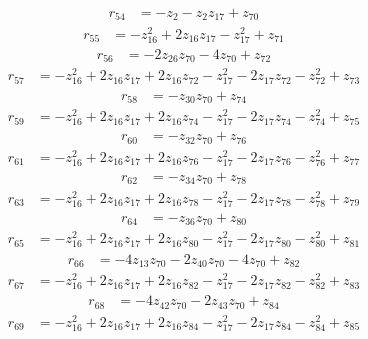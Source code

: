 \begin{align*}
r_{54} &=-z_{2}-z_{2}z_{17}+z_{70}
\end{align*}
\begin{align*}
r_{55} &=-z_{16}^{2}+2z_{16}z_{17}-z_{17}^{2}+z_{71}
\end{align*}
\begin{align*}
r_{56} &=-2z_{26}z_{70}-4z_{70}+z_{72}
\end{align*}
\begin{align*}
r_{57} &=-z_{16}^{2}+2z_{16}z_{17}+2z_{16}z_{72}-z_{17}^{2}-2z_{17}z_{72}-z_{72}^{2}+z_{73}
\end{align*}
\begin{align*}
r_{58} &=-z_{30}z_{70}+z_{74}
\end{align*}
\begin{align*}
r_{59} &=-z_{16}^{2}+2z_{16}z_{17}+2z_{16}z_{74}-z_{17}^{2}-2z_{17}z_{74}-z_{74}^{2}+z_{75}
\end{align*}
\begin{align*}
r_{60} &=-z_{32}z_{70}+z_{76}
\end{align*}
\begin{align*}
r_{61} &=-z_{16}^{2}+2z_{16}z_{17}+2z_{16}z_{76}-z_{17}^{2}-2z_{17}z_{76}-z_{76}^{2}+z_{77}
\end{align*}
\begin{align*}
r_{62} &=-z_{34}z_{70}+z_{78}
\end{align*}
\begin{align*}
r_{63} &=-z_{16}^{2}+2z_{16}z_{17}+2z_{16}z_{78}-z_{17}^{2}-2z_{17}z_{78}-z_{78}^{2}+z_{79}
\end{align*}
\begin{align*}
r_{64} &=-z_{36}z_{70}+z_{80}
\end{align*}
\begin{align*}
r_{65} &=-z_{16}^{2}+2z_{16}z_{17}+2z_{16}z_{80}-z_{17}^{2}-2z_{17}z_{80}-z_{80}^{2}+z_{81}
\end{align*}
\begin{align*}
r_{66} &=-4z_{13}z_{70}-2z_{40}z_{70}-4z_{70}+z_{82}
\end{align*}
\begin{align*}
r_{67} &=-z_{16}^{2}+2z_{16}z_{17}+2z_{16}z_{82}-z_{17}^{2}-2z_{17}z_{82}-z_{82}^{2}+z_{83}
\end{align*}
\begin{align*}
r_{68} &=-4z_{42}z_{70}-2z_{43}z_{70}+z_{84}
\end{align*}
\begin{align*}
r_{69} &=-z_{16}^{2}+2z_{16}z_{17}+2z_{16}z_{84}-z_{17}^{2}-2z_{17}z_{84}-z_{84}^{2}+z_{85}
\end{align*}
